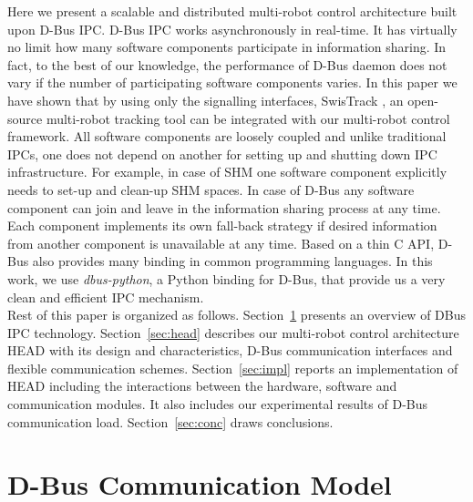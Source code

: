 \documentclass{ifacconf}
\begin{document}
Here we present a scalable and distributed multi-robot control architecture built upon D-Bus IPC. D-Bus IPC works asynchronously in real-time. It has virtually no limit how many software components participate in information sharing. In fact, to the best of our knowledge, the performance of D-Bus daemon does not vary if the number of participating software components varies. In this paper we have shown that by using only the signalling interfaces, SwisTrack \cite{Lochmatter+2008}, an open-source multi-robot tracking tool can be integrated with our multi-robot control framework. All software components are loosely coupled and unlike traditional IPCs, one does not depend on another for setting up and shutting down IPC infrastructure. For example, in case of SHM one software component explicitly needs to set-up and clean-up SHM spaces. In case of D-Bus any software component can join and leave in the information sharing process at any time. Each component implements its own fall-back strategy if desired information from another component is unavailable at any time. Based on a thin C API, D-Bus also provides many binding in common programming languages. In this work, we use {\em dbus-python}, a Python binding for D-Bus, that provide us a very clean and efficient IPC mechanism.\\
Rest of this paper is organized as follows. Section~\ref{sec:dbus} presents an overview of DBus IPC technology.  Section~\ref{sec:head} describes our multi-robot control architecture HEAD with its design and characteristics, D-Bus communication interfaces and flexible communication schemes.  Section~\ref{sec:impl} reports an implementation of HEAD including the interactions between the hardware, software and communication modules. It also includes  our experimental results of D-Bus communication load. Section~\ref{sec:conc} draws conclusions.
\section{D-Bus Communication Model}
\label{sec:dbus}
\end{document}
